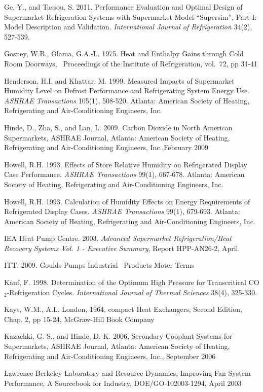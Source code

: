 Ge, Y., and Tassou, S. 2011. Performance Evaluation and Optimal Design of Supermarket Refrigeration Systems with Supermarket Model ``Supersim'', Part I: Model Description and Validation. \emph{International Journal of Refrigeration} 34(2), 527-539.

Gosney, W.B., Olama, G.A.-L. 1975. Heat and Enthalpy Gains through Cold Room Doorways,~ Proceedings of the Institute of Refrigeration, vol.~72, pp 31-41

Henderson, H.I. and Khattar, M. 1999. Measured Impacts of Supermarket Humidity Level on Defrost Performance and Refrigerating System Energy Use. \emph{ASHRAE Transactions} 105(1), 508-520. Atlanta: American Society of Heating, Refrigerating and Air-Conditioning Engineers, Inc.

Hinde, D., Zha, S., and Lan, L. 2009. Carbon Dioxide in North American Supermarkets, ASHRAE Journal, Atlanta: American Society of Heating, Refrigerating and Air-Conditioning Engineers, Inc.,February 2009

Howell, R.H. 1993. Effects of Store Relative Humidity on Refrigerated Display Case Performance. \emph{ASHRAE Transactions} 99(1), 667-678. Atlanta: American Society of Heating, Refrigerating and Air-Conditioning Engineers, Inc.

Howell, R.H. 1993. Calculation of Humidity Effects on Energy Requirements of Refrigerated Display Cases. \emph{ASHRAE Transactions} 99(1), 679-693. Atlanta: American Society of Heating, Refrigerating and Air-Conditioning Engineers, Inc.

IEA Heat Pump Centre. 2003. \emph{Advanced Supermarket Refrigeration/Heat Recovery Systems Vol. 1 - Executive Summary}, Report HPP-AN26-2, April.

ITT. 2009. Goulds Pumps Industrial~ Products Moter Terms

Kauf, F. 1998. Determination of the Optimum High Pressure for Transcritical CO\(_{2}\)-Refrigeration Cycles. \emph{International Journal of Thermal Sciences} 38(4), 325-330.

Kays, W.M., A.L. London, 1964, compact Heat Exchangers, Second Edition, Chap. 2, pp 15-24, McGraw-Hill Book Company

Kazachki, G. S., and Hinde, D. K. 2006, Secondary Cooplant Systems for Supermarkets, ASHRAE Journal, Atlanta: American Society of Heating, Refrigerating and Air-Conditioning Engineers, Inc., September 2006

Lawrence Berkeley Laboratory and Resource Dynamics, Improving Fan System Performance, A Sourcebook for Industry, DOE/GO-102003-1294, April 2003

